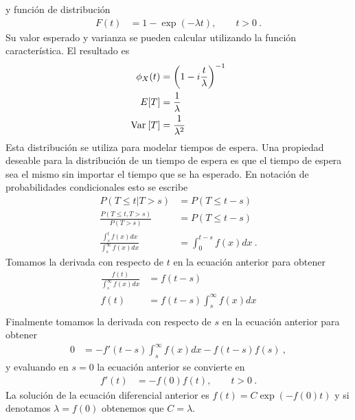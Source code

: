\documentclass[12pt,reqno]{amsart}\usepackage[]{graphicx}\usepackage[]{color}
\begin{document}
y función de distribución
\begin{equation}\label{pexp}
  \begin{split}
  F(t)&= 1-\exp(-\lambda t),\qquad t > 0 \:.
  \end{split}
\end{equation}
Su valor esperado y varianza se pueden calcular utilizando la función característica. El resultado es
\begin{equation}\label{mexp}
  \begin{split}
  \phi_{X}(t) &= \biggl( 1 - i \frac{t}{\lambda} \biggr)^{-1} \\
  E[T] &= \frac{1}{\lambda}\\
  \mathrm{Var}\: [T] &=\frac{1}{\lambda^2} \\
  \end{split}
\end{equation}
Esta distribución se utiliza para modelar tiempos de espera. Una propiedad deseable para la distribución de un tiempo de espera es que el tiempo de espera sea el mismo sin importar el tiempo que se ha esperado. En notación de probabilidades condicionales esto se escribe
\begin{equation}\label{prop_exp}
  \begin{split}
    P(T \leq t | T > s ) &= P( T \leq t-s)\\
    \frac{P(T \leq t , T > s )}{P(T>s)} &= P( T \leq t-s)\\
    \frac{\int_{s}^{t} f(x) dx}{\int_{s}^{\infty}f(x)dx} &= \int_{0}^{t-s}f(x)dx\:.
  \end{split}
\end{equation}
Tomamos la derivada con respecto de $t$ en la ecuación anterior para obtener
\begin{equation}
  \begin{split}
    \frac{f(t)}{\int_{s}^{\infty}f(x)dx} &= f(t-s)\\
    f(t)&= f(t-s)\int_{s}^{\infty}f(x)dx\\
  \end{split}
\end{equation}
Finalmente tomamos la derivada con respecto de $s$ en la ecuación anterior para obtener
\begin{equation}
  \begin{split}
    0 &= -f'(t-s)\int_{s}^{\infty}f(x)dx -f(t-s)f(s) \:,
  \end{split}
\end{equation}
y evaluando en $s=0$ la ecuación anterior se convierte en
\begin{equation}
  \begin{split}
    f'(t) &=-f(0)f(t) ,\qquad t>0\:.
  \end{split}
\end{equation}
La solución de la ecuación diferencial anterior es $f(t)=C\exp(-f(0)t)$ y si denotamos $\lambda=f(0)$ obtenemos que $C=\lambda$.
\end{document}
